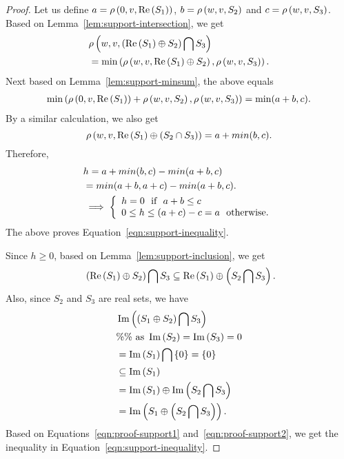 \begin{proof}
Let us
define $a = \rho\left(0,v,\operatorname{Re}\left(S_1\right)\right)$, $b=\rho\left(w,v,S_2\right)$
and $c = \rho\left(w,v,S_3\right)$.  
Based on Lemma~\ref{lem:support-intersection}, we get
%
\begin{align*}
& \rho\left(w,v,\left(\operatorname{Re}\left(S_1\right)\oplus S_2\right)\bigcap
  S_3\right)\\
& = \min\left(\rho\left(w,v,\operatorname{Re}\left(S_1\right)\oplus
    S_2\right),\rho\left(w,v,S_3\right)\right).
\end{align*}
%
Next based on Lemma~\ref{lem:support-minsum}, the above equals
\begin{align*}
\min\left(\rho\left(0,v,\operatorname{Re}\left(S_1\right)\right)+\rho\left(w,v,S_2\right),\rho\left(w,v,S_3\right)\right)
= \min(a+b,c).
\end{align*}
%
  By a similar calculation, we also get
%
\[
\rho\left(w,v,\operatorname{Re}\left(S_1\right)\oplus\left(S_2\cap S_3\right)\right) =
a+min(b,c).  
\]
%
Therefore, 
%
\begin{align}
& h = a+min(b,c)-min(a+b,c)\nonumber\\
& = min(a+b,a+c)-min(a+b,c).\nonumber\\
& \implies \left\{\begin{array}{l}
h=0~~\text{if}~~a+b\leq c\\
0\leq h\leq (a+c)-c = a~~\text{otherwise}.
\end{array}
\right.
\end{align}
%
The above proves Equation~\ref{eqn:support-inequality}.

Since $h\geq0$, based on Lemma~\ref{lem:support-inclusion}, we get
%
\begin{equation}~\label{eqn:proof-support1}
\left(\operatorname{Re}\left(S_1\right)\oplus S_2\right)\bigcap S_3\subseteq \operatorname{Re}\left(S_1\right)\oplus\left(S_2\bigcap S_3\right).
\end{equation}
%
Also, since $S_2$ and $S_3$ are real sets, we have
%
\begin{align}
& \operatorname{Im}\left(\left(S_1\oplus S_2\right)\bigcap S_3\right)\\
& \%\%~\text{as}~\operatorname{Im}\left(S_2\right)=\operatorname{Im}\left(S_3\right)=0\nonumber\\
& = \operatorname{Im}\left(S_1\right)\bigcap \left\{0\right\}=\left\{0\right\}\nonumber\\
& \subseteq
\operatorname{Im}\left(S_1\right)\nonumber\\
& =
\operatorname{Im}\left(S_1\right)\oplus\operatorname{Im}\left(S_2\bigcap S_3\right)\\
& = \operatorname{Im}\left(S_1\oplus\left(S_2\bigcap S_3\right)\right).~\label{eqn:proof-support2}
\end{align}
%
Based on Equations~\ref{eqn:proof-support1} and~\ref{eqn:proof-support2}, we
get the inequality in Equation~\ref{eqn:support-inequality}.
\end{proof}

